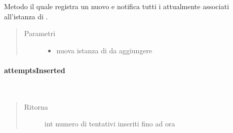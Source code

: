 \documentclass[letterpaper,10pt,italian,openany,oneside]{sphinxmanual}
\begin{document}
\begin{fulllineitems}
\label{\detokenize{source/it/unicam/cs/pa/mastermind/gamecore/BoardModel:it.unicam.cs.pa.mastermind.gamecore.BoardModel.addObserver(BoardObserver)}}
Metodo il quale registra un nuovo  e notifica tutti i  attualmente associati all’istanza di .
\begin{quote}\begin{description}
\item[{Parametri}] \leavevmode\begin{itemize}
\item {} 
 \textendash{} nuova istanza di  da aggiungere

\end{itemize}

\end{description}\end{quote}

\end{fulllineitems}



\paragraph{attemptsInserted}
\label{\detokenize{source/it/unicam/cs/pa/mastermind/gamecore/BoardModel:attemptsinserted}}

\begin{fulllineitems}
\label{\detokenize{source/it/unicam/cs/pa/mastermind/gamecore/BoardModel:it.unicam.cs.pa.mastermind.gamecore.BoardModel.attemptsInserted()}}~\begin{quote}\begin{description}
\item[{Ritorna}] \leavevmode
int numero di tentativi inseriti fino ad ora

\end{description}\end{quote}

\end{fulllineitems}
\end{document}
